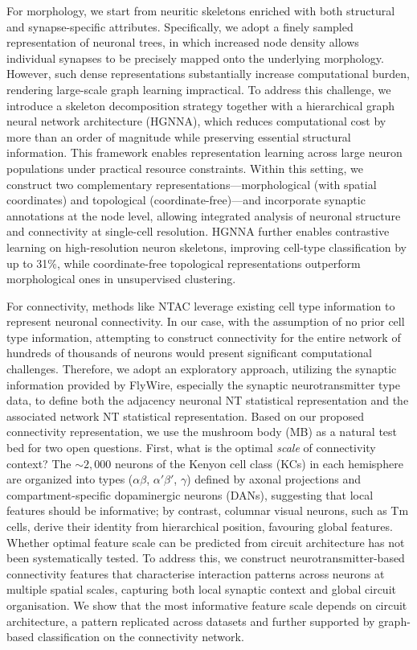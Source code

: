 \documentclass[10pt]{article}
\begin{document}
For morphology, we start from neuritic skeletons enriched with both structural and synapse-specific attributes. Specifically, we adopt a finely sampled representation of neuronal trees, in which increased node density allows individual synapses to be precisely mapped onto the underlying morphology. However, such dense representations substantially increase computational burden, rendering large-scale graph learning impractical. To address this challenge, we introduce a skeleton decomposition strategy together with a hierarchical graph neural network architecture (HGNNA), which reduces computational cost by more than an order of magnitude while preserving essential structural information. This framework enables representation learning across large neuron populations under practical resource constraints. Within this setting, we construct two complementary representations---morphological (with spatial coordinates) and topological (coordinate-free)---and incorporate synaptic annotations at the node level, allowing integrated analysis of neuronal structure and connectivity at single-cell resolution. HGNNA further enables contrastive learning on high-resolution neuron skeletons, improving cell-type classification by up to 31\%, while coordinate-free topological representations outperform morphological ones in unsupervised clustering.

For connectivity, methods like NTAC leverage existing cell type information to represent neuronal connectivity\cite{schwartzman2026ntac}. In our case, with the assumption of no prior cell type information, attempting to construct connectivity for the entire network of hundreds of thousands of neurons would present significant computational challenges. Therefore, we adopt an exploratory approach, utilizing the synaptic information provided by FlyWire, especially the synaptic neurotransmitter type data, to define both the adjacency neuronal NT statistical representation and the associated network NT statistical representation. Based on our proposed connectivity representation, we use the mushroom body (MB) as a natural test bed for two open questions. First, what is the optimal \textit{scale} of connectivity context? The ${\sim}2{,}000$ neurons of the Kenyon cell class (KCs) in each hemisphere are organized into types ($\alpha\beta$, $\alpha'\beta'$, $\gamma$) defined by axonal projections and compartment-specific dopaminergic neurons (DANs)\cite{aso2014mushroom,modi2020dopamine_kc}, suggesting that local features should be informative; by contrast, columnar visual neurons, such as Tm cells, derive their identity from hierarchical position\cite{takemura2013visual,shinomiya2019tm}, favouring global features. Whether optimal feature scale can be predicted from circuit architecture has not been systematically tested. To address this, we construct neurotransmitter-based connectivity features that characterise interaction patterns across neurons at multiple spatial scales, capturing both local synaptic context and global circuit organisation. We show that the most informative feature scale depends on circuit architecture, a pattern replicated across datasets and further supported by graph-based classification on the connectivity network.
\end{document}
